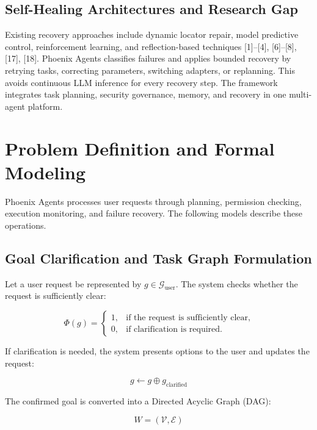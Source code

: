 \documentclass[conference]{IEEEtran}
\begin{document}
\subsection{Self-Healing Architectures and Research Gap}

Existing recovery approaches include dynamic locator repair, model predictive control, reinforcement learning, and reflection-based techniques [1]--[4], [6]--[8], [17], [18]. Phoenix Agents classifies failures and applies bounded recovery by retrying tasks, correcting parameters, switching adapters, or replanning. This avoids continuous LLM inference for every recovery step. The framework integrates task planning, security governance, memory, and recovery in one multi-agent platform.

\section{Problem Definition and Formal Modeling}

Phoenix Agents processes user requests through planning, permission checking, execution monitoring, and failure recovery. The following models describe these operations.

\subsection{Goal Clarification and Task Graph Formulation}

Let a user request be represented by $g \in \mathcal{G}_{\text{user}}$. The system checks whether the request is sufficiently clear:

\begin{equation}
\Phi(g) =
\begin{cases}
1, & \text{if the request is sufficiently clear,}\\
0, & \text{if clarification is required.}
\end{cases}
\end{equation}

If clarification is needed, the system presents options to the user and updates the request:

\begin{equation}
g \leftarrow g \oplus g_{\text{clarified}}
\end{equation}

The confirmed goal is converted into a Directed Acyclic Graph (DAG):

\begin{equation}
W = (\mathcal{V}, \mathcal{E})
\end{equation}
\end{document}
